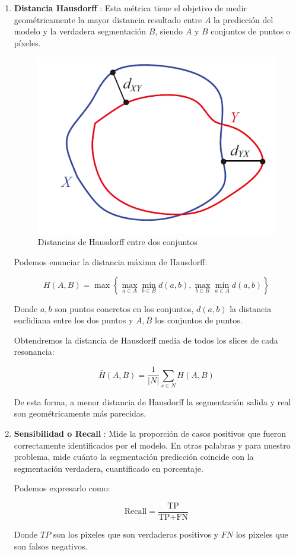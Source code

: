 \begin{enumerate}
	\item \textbf{Distancia Hausdorff} : Esta métrica tiene el objetivo de medir geométricamente la mayor distancia resultado entre $A$ la predicción del modelo y la verdadera segmentación $B$, siendo $A$ y $B$ conjuntos de puntos o píxeles.
	
	\begin{figure}[H]
		\centering
		\includegraphics[width=0.4\linewidth]{imagenes/distanceHaussdorff.png}
		\caption{Distancias de Hausdorff entre dos conjuntos}
	\end{figure}
	
	Podemos enunciar la distancia máxima de Hausdorff:
	
	$$ H(A, B) = \max \left\{ \max_{a \in A} \min_{b \in B} d(a, b), \max_{b \in B} \min_{a \in A} d(a, b) \right\} $$
	
	Donde $a, b$ son puntos concretos en los conjuntos, $d(a, b)$ la distancia euclidiana entre los dos puntos y $A, B$ los conjuntos de puntos.
	
	Obtendremos la distancia de Hausdorff media de todos los slices de cada resonancia:
	
	$$ \bar{H}(A, B) = \frac{1}{|N|} \sum_{s \in N} H(A, B) $$
	
	De esta forma, a menor distancia de Hausdorff la segmentación salida y real son geométricamente más parecidas.
	
	\item \textbf{Sensibilidad o Recall} : Mide la proporción de casos positivos que fueron correctamente identificados por el modelo. En otras palabras y para nuestro problema, mide cuánto la segmentación predicción coincide con la segmentación verdadera, cuantificado en porcentaje.
	
	Podemos expresarlo como:
	
	$$ \text{Recall} = \frac{\text{TP}}{\text{TP} + \text{FN}} $$
	
	Donde $TP$ son los pixeles que son verdaderos positivos y $FN$ los pixeles que son falsos negativos.
	
\end{enumerate}
